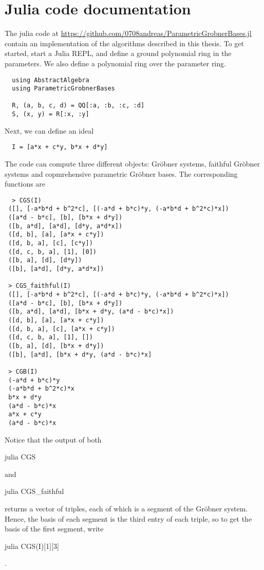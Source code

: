 \section{Julia code documentation}
The julia code at \url{https://github.com/0708andreas/ParametricGrobnerBases.jl} contain an implementation of the algorithms described in this thesis. To get started, start a Julia REPL, and define a ground polynomial ring in the parameters. We also define a polynomial ring over the parameter ring.

\begin{verbatim}
  using AbstractAlgebra
  using ParametricGrobnerBases

  R, (a, b, c, d) = QQ[:a, :b, :c, :d]
  S, (x, y) = R[:x, :y]
\end{verbatim}

Next, we can define an ideal

\begin{verbatim}
  I = [a*x + c*y, b*x + d*y]
\end{verbatim}

The code can compute three different objects: Gröbner systems, faithful Gröbner systems and copmrehensive parametric Gröbner bases. The corresponding functions are

\begin{verbatim}
  > CGS(I)
 ([], [-a*b*d + b^2*c], [(-a*d + b*c)*y, (-a*b*d + b^2*c)*x])
 ([a*d - b*c], [b], [b*x + d*y])
 ([b, a*d], [a*d], [d*y, a*d*x])
 ([d, b], [a], [a*x + c*y])
 ([d, b, a], [c], [c*y])
 ([d, c, b, a], [1], [0])
 ([b, a], [d], [d*y])
 ([b], [a*d], [d*y, a*d*x])

 > CGS_faithful(I)
 ([], [-a*b*d + b^2*c], [(-a*d + b*c)*y, (-a*b*d + b^2*c)*x])
 ([a*d - b*c], [b], [b*x + d*y])
 ([b, a*d], [a*d], [b*x + d*y, (a*d - b*c)*x])
 ([d, b], [a], [a*x + c*y])
 ([d, b, a], [c], [a*x + c*y])
 ([d, c, b, a], [1], [])
 ([b, a], [d], [b*x + d*y])
 ([b], [a*d], [b*x + d*y, (a*d - b*c)*x]

 > CGB(I)
 (-a*d + b*c)*y
 (-a*b*d + b^2*c)*x
 b*x + d*y
 (a*d - b*c)*x
 a*x + c*y
 (a*d - b*c)*x
\end{verbatim}
Notice that the output of both \begin{mintinline}{julia} CGS \end{mintinline} and \begin{mintinline}{julia} CGS_faithful \end{mintinline} returns a vector of triples, each of which is a segment of the Gröbner system. Hence, the basis of each segment is the third entry of each triple, so to get the basis of the first segment, write \begin{mintinline}{julia} CGS(I)[1][3] \end{mintinline}.

